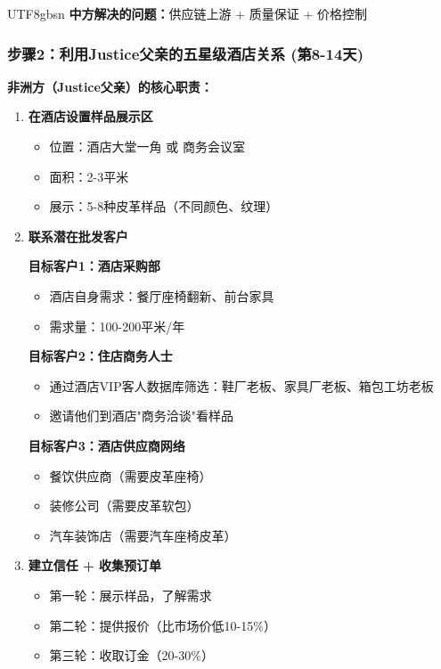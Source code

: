 \documentclass[12pt,a4paper]{article}
\begin{document}
\begin{CJK}{UTF8}{gbsn}
\textbf{中方解决的问题：}供应链上游 + 质量保证 + 价格控制

\subsubsection{步骤2：利用Justice父亲的五星级酒店关系 (第8-14天)}

\textbf{非洲方（Justice父亲）的核心职责：}

\begin{enumerate}
    \item \textbf{在酒店设置样品展示区}
    \begin{itemize}
        \item 位置：酒店大堂一角 或 商务会议室
        \item 面积：2-3平米
        \item 展示：5-8种皮革样品（不同颜色、纹理）
    \end{itemize}
    
    \item \textbf{联系潜在批发客户}
    
    \textbf{目标客户1：酒店采购部}
    \begin{itemize}
        \item 酒店自身需求：餐厅座椅翻新、前台家具
        \item 需求量：100-200平米/年
    \end{itemize}
    
    \textbf{目标客户2：住店商务人士}
    \begin{itemize}
        \item 通过酒店VIP客人数据库筛选：鞋厂老板、家具厂老板、箱包工坊老板
        \item 邀请他们到酒店"商务洽谈"看样品
    \end{itemize}
    
    \textbf{目标客户3：酒店供应商网络}
    \begin{itemize}
        \item 餐饮供应商（需要皮革座椅）
        \item 装修公司（需要皮革软包）
        \item 汽车装饰店（需要汽车座椅皮革）
    \end{itemize}
    
    \item \textbf{建立信任 + 收集预订单}
    \begin{itemize}
        \item 第一轮：展示样品，了解需求
        \item 第二轮：提供报价（比市场价低10-15\%）
        \item 第三轮：收取订金（20-30\%）
    \end{itemize}
\end{enumerate}


\end{CJK}
\end{document}
